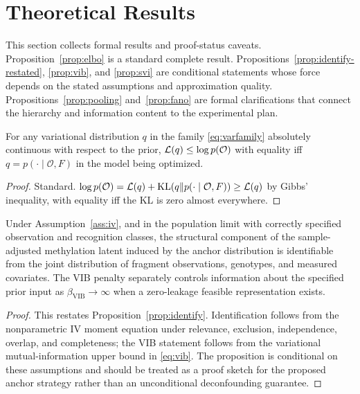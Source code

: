 \section{Theoretical Results}
\label{sec:theory}

This section collects formal results and proof-status caveats. Proposition~\ref{prop:elbo} is a standard complete result. Propositions~\ref{prop:identify-restated}, \ref{prop:vib}, and \ref{prop:svi} are conditional statements whose force depends on the stated assumptions and approximation quality. Propositions~\ref{prop:pooling} and~\ref{prop:fano} are formal clarifications that connect the hierarchy and information content to the experimental plan.

\begin{proposition}
\label{prop:elbo}
For any variational distribution $q$ in the family \eqref{eq:varfamily} absolutely continuous with respect to the prior, $\mathcal{L}(q)\le \log p(\mathcal{O})$ with equality iff $q=p(\cdot\mid \mathcal{O},F)$ in the model being optimized.
\end{proposition}
\begin{proof}
Standard. $\log p(\mathcal{O})=\mathcal{L}(q)+\mathrm{KL}(q\|p(\cdot\mid \mathcal{O},F))\ge\mathcal{L}(q)$ by Gibbs' inequality, with equality iff the KL is zero almost everywhere.
\end{proof}

\begin{proposition}
\label{prop:identify-restated}
Under Assumption~\ref{ass:iv}, and in the population limit with correctly specified observation and recognition classes, the structural component of the sample-adjusted methylation latent induced by the anchor distribution is identifiable from the joint distribution of fragment observations, genotypes, and measured covariates. The VIB penalty separately controls information about the specified prior input as $\beta_{\mathrm{VIB}}\to\infty$ when a zero-leakage feasible representation exists.
\end{proposition}
\begin{proof}
This restates Proposition~\ref{prop:identify}. Identification follows from the nonparametric IV moment equation under relevance, exclusion, independence, overlap, and completeness; the VIB statement follows from the variational mutual-information upper bound in \eqref{eq:vib}. The proposition is conditional on these assumptions and should be treated as a proof sketch for the proposed anchor strategy rather than an unconditional deconfounding guarantee.
\end{proof}

